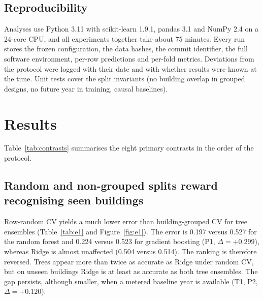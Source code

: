 \documentclass[11pt]{article}
\begin{document}
\subsection{Reproducibility}
Analyses use Python 3.11 with scikit-learn 1.9.1, pandas 3.1 and NumPy 2.4 on a 24-core CPU, and all experiments together take about 75 minutes. Every run stores the frozen configuration, the data hashes, the commit identifier, the full software environment, per-row predictions and per-fold metrics. Deviations from the protocol were logged with their date and with whether results were known at the time. Unit tests cover the split invariants (no building overlap in grouped designs, no future year in training, causal baselines).

\section{Results}
\label{sec:results}

Table~\ref{tab:contrasts} summarises the eight primary contrasts in the order of the protocol.

\begin{table}[t]
\centering\small
\caption{Primary contrasts of the protocol. Differences in MAE on the log scale, with cluster-bootstrap 95\% confidence intervals and Holm-adjusted $p$-values. ``Substantial'' requires significance and $|\Delta|\ge0.02$. Gradient boosting (M4) unless stated otherwise.}
\label{tab:contrasts}
\resizebox{\linewidth}{!}{}
\end{table}

\subsection{Random and non-grouped splits reward recognising seen buildings}
\label{sec:res-design}

Row-random CV yields a much lower error than building-grouped CV for tree ensembles (Table~\ref{tab:e1} and Figure~\ref{fig:e1}). The error is 0.197 versus 0.527 for the random forest and 0.224 versus 0.523 for gradient boosting (P1, $\Delta=+0.299$), whereas Ridge is almost unaffected (0.504 versus 0.514). The ranking is therefore reversed. Trees appear more than twice as accurate as Ridge under random CV, but on unseen buildings Ridge is at least as accurate as both tree ensembles. The gap persists, although smaller, when a metered baseline year is available (T1, P2, $\Delta=+0.120$).

\begin{table}[t]
\centering\small
\caption{MAE on the log scale under row-random and building-grouped cross-validation, averaged over 5 repeats.}
\label{tab:e1}

\end{table}
\end{document}
